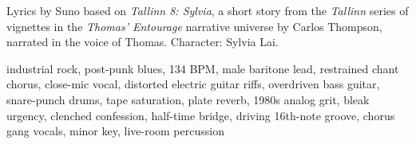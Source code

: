 
\begin{notes}
Lyrics by Suno based on \emph{Tallinn 8: Sylvia}, a short story from the \emph{Tallinn} series of vignettes in the \emph{Thomas’ Entourage} narrative universe by Carlos Thompson, narrated in the voice of Thomas. Character: Sylvia Lai.
\end{notes}
\begin{style}
industrial rock, post-punk blues, 134 BPM, male baritone lead, restrained chant chorus, close-mic vocal, distorted electric guitar riffs, overdriven bass guitar, snare-punch drums, tape saturation, plate reverb, 1980s analog grit, bleak urgency, clenched confession, half-time bridge, driving 16th-note groove, chorus gang vocals, minor key, live-room percussion
\end{style}
